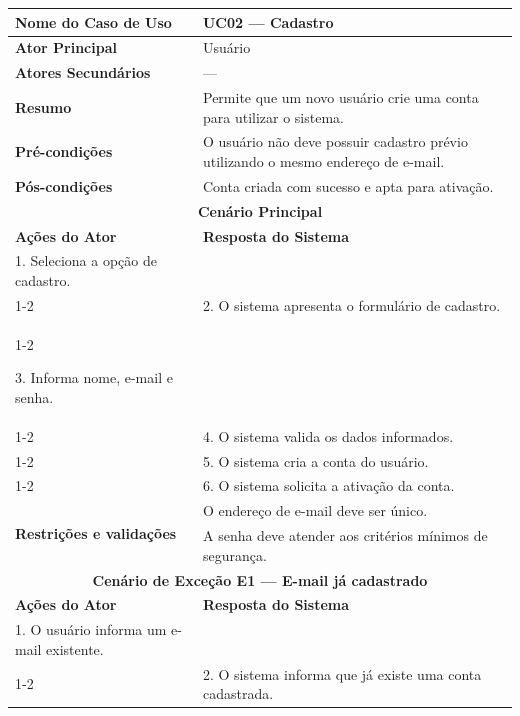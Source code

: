 
\begin{longtable}{| p{} | p{} |}
\hline

\textbf{Nome do Caso de Uso} &
UC02 --- Cadastro \\
\hline

\textbf{Ator Principal} &
Usuário \\
\hline

\textbf{Atores Secundários} &
--- \\
\hline

\textbf{Resumo} &
Permite que um novo usuário crie uma conta para utilizar o sistema. \\
\hline

\textbf{Pré-condições} &
O usuário não deve possuir cadastro prévio utilizando o mesmo endereço de e-mail. \\
\hline

\textbf{Pós-condições} &
Conta criada com sucesso e apta para ativação. \\
\hline

\multicolumn{2}{|c|}{\textbf{Cenário Principal}}\\
\hline

\textbf{Ações do Ator} &
\textbf{Resposta do Sistema} \\
\hline

1. Seleciona a opção de cadastro. & \\
\cline{1-2}

&
2. O sistema apresenta o formulário de cadastro.\\
\cline{1-2}

3. Informa nome, e-mail e senha. & \\
\cline{1-2}

&
4. O sistema valida os dados informados.\\
\cline{1-2}

&
5. O sistema cria a conta do usuário.\\
\cline{1-2}


&
6. O sistema solicita a ativação da conta.\\
\hline

\multirow{2}{.40\textwidth}{\textbf{Restrições e validações}} &
O endereço de e-mail deve ser único.\\
\cline{2-2}

&
A senha deve atender aos critérios mínimos de segurança.\\
\hline

\multicolumn{2}{|c|}{\textbf{Cenário de Exceção E1 --- E-mail já cadastrado}}\\
\hline
\textbf{Ações do Ator} &
\textbf{Resposta do Sistema} \\
\hline

1. O usuário informa um e-mail existente. & \\
\cline{1-2}

&
2. O sistema informa que já existe uma conta cadastrada.\\
\hline

\end{longtable}
